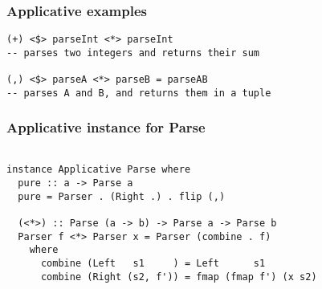 \documentclass{beamer}
\begin{document}
\begin{frame}
\frametitle{Applicative examples}

\begin{lstlisting}
(+) <$> parseInt <*> parseInt
-- parses two integers and returns their sum

(,) <$> parseA <*> parseB = parseAB
-- parses A and B, and returns them in a tuple
\end{lstlisting}

\end{frame}


%
%
%


\begin{frame}
\frametitle{Applicative instance for Parse}

\begin{lstlisting}

instance Applicative Parse where
  pure :: a -> Parse a
  pure = Parser . (Right .) . flip (,)

  (<*>) :: Parse (a -> b) -> Parse a -> Parse b
  Parser f <*> Parser x = Parser (combine . f)
    where
      combine (Left   s1     ) = Left      s1
      combine (Right (s2, f')) = fmap (fmap f') (x s2)

\end{lstlisting}

\end{frame}


%
%
%
%
%
%
\end{document}
